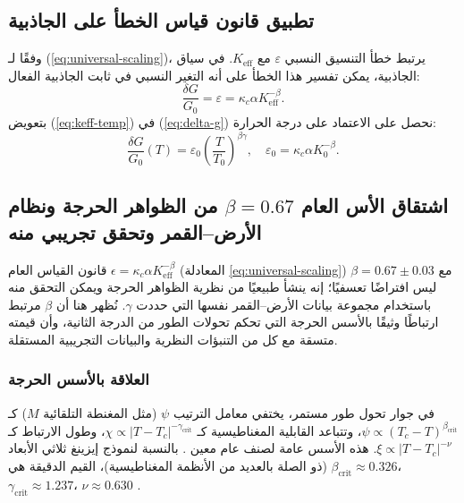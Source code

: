 \documentclass[11pt,a4paper]{article}
\newcommand{\Keff}{K_{\mathrm{eff}}}
\newcommand{\eps}{\varepsilon}
\newcommand{\kappac}{\kappa_c}
\begin{document}
	\subsection{تطبيق قانون قياس الخطأ على الجاذبية}
	\label{subsec:error-gravity}
	
	وفقًا لـ (\ref{eq:universal-scaling})، يرتبط خطأ التنسيق النسبي $\eps$ مع $\Keff$. في سياق الجاذبية، يمكن تفسير هذا الخطأ على أنه التغير النسبي في ثابت الجاذبية الفعال:
	\begin{equation}
		\frac{\delta G}{G_0} = \eps = \kappac \alpha \Keff^{-\beta}.
		\label{eq:delta-g}
	\end{equation}
	بتعويض (\ref{eq:keff-temp}) في (\ref{eq:delta-g}) نحصل على الاعتماد على درجة الحرارة:
	\begin{equation}
		\frac{\delta G}{G_0}(T) = \eps_0 \left( \frac{T}{T_0} \right)^{\beta\gamma}, \quad \eps_0 = \kappac \alpha K_0^{-\beta}.
		\label{eq:g-temp}
	\end{equation}
	
	\subsection{اشتقاق الأس العام $\beta = 0.67$ من الظواهر الحرجة ونظام الأرض–القمر وتحقق تجريبي منه}
	\label{subsec:beta-empirical}
	
	قانون القياس العام $\epsilon = \kappa_c \alpha K_{\mathrm{eff}}^{-\beta}$ (المعادلة \ref{eq:universal-scaling}) مع $\beta = 0.67 \pm 0.03$ ليس افتراضًا تعسفيًا؛ إنه ينشأ طبيعيًا من نظرية الظواهر الحرجة ويمكن التحقق منه باستخدام مجموعة بيانات الأرض–القمر نفسها التي حددت $\gamma$. نُظهر هنا أن $\beta$ مرتبط ارتباطًا وثيقًا بالأسس الحرجة التي تحكم تحولات الطور من الدرجة الثانية، وأن قيمته متسقة مع كل من التنبؤات النظرية والبيانات التجريبية المستقلة.
	
	\subsubsection{العلاقة بالأسس الحرجة}
	في جوار تحول طور مستمر، يختفي معامل الترتيب $\psi$ (مثل المغنطة التلقائية $M$) كـ $\psi \propto (T_c - T)^{\beta_{\mathrm{crit}}}$، وتتباعد القابلية المغناطيسية كـ $\chi \propto |T - T_c|^{-\gamma_{\mathrm{crit}}}$، وطول الارتباط كـ $\xi \propto |T - T_c|^{-\nu}$. هذه الأسس عامة لصنف عام معين \cite{Wilson1974, Fisher1974}. بالنسبة لنموذج إيزينغ ثلاثي الأبعاد (ذو الصلة بالعديد من الأنظمة المغناطيسية)، القيم الدقيقة هي $\beta_{\mathrm{crit}} \approx 0.326$، $\gamma_{\mathrm{crit}} \approx 1.237$، $\nu \approx 0.630$ \cite{El-Showk2014}.
	
\end{document}
